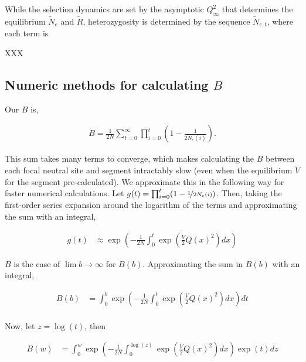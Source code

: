 \documentclass[11pt]{article}
\begin{document}
While the selection dynamics are set by the asymptotic $Q_\infty^2$ that
determines the equilibrium $\widetilde{N}_e$ and $\widetilde{R}$,
heterozygosity is determined by the sequence $\widetilde{N}_{e,t}$, where each
term is 

XXX


\subsection*{Numeric methods for calculating $B$}

Our $B$ is,

\begin{align}
  B = \frac{1}{2N} \sum_{t=0}^\infty \prod_{i=0}^t \left(1 - \frac{1}{2N_e(i)}\right).
\end{align}

This sum takes many terms to converge, which makes calculating the $B$ between
each focal neutral site and segment intractably slow (even when the equilibrium
$\widetilde{V}$ for the segment pre-calculated). We approximate this in the
following way for faster numerical calculations. Let $g(t) = \prod_{i=0}^t (1 -
\nicefrac{1}{2N_e(i)})$. Then, taking the first-order series expansion around
the logarithm of the terms and approximating the sum with an integral,

\begin{align}
  g(t) &\approx \exp\left(- \frac{1}{2N} \int_0^t \exp\left(\frac{V}{2} Q(x)^2 \right) dx \right) 
\end{align}

$B$ is the case of $\lim b \to \infty$ for $B(b)$. Approximating the sum in
$B(b)$ with an integral,

\begin{align}
  B(b) &= \int_0^b \exp\left(- \frac{1}{2N} \int_0^t \exp\left(\frac{V}{2} Q(x)^2 \right) dx \right) dt \\
\end{align}

Now, let $z = \log(t)$, then

\begin{align}
  B(w) &= \int_0^w \exp\left(- \frac{1}{2N} \int_0^{\log(z)} \exp\left(\frac{V}{2} Q(x)^2 \right) dx \right) \exp(t) dz \\
\end{align}
\end{document}
